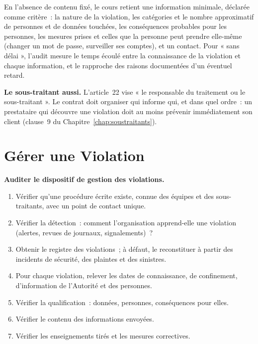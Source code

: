 En l'absence de contenu fixé, le cours retient une information minimale,
déclarée comme critère~: la nature de la violation, les catégories et le
nombre approximatif de personnes et de données touchées, les conséquences
probables pour les personnes, les mesures prises et celles que la personne
peut prendre elle-même (changer un mot de passe, surveiller ses comptes),
et un contact. Pour « sans délai », l'audit mesure le temps écoulé entre la
connaissance de la violation et chaque information, et le rapproche des
raisons documentées d'un éventuel retard.

\begin{boxinfo}
\textbf{Le sous-traitant aussi.} L'article~22 vise « le responsable du
traitement ou le sous-traitant ». Le contrat doit organiser qui informe
qui, et dans quel ordre~: un prestataire qui découvre une violation doit
au moins prévenir immédiatement son client (clause~9 du
Chapitre~\ref{chap:soustraitants}).
\end{boxinfo}

\section{Gérer une Violation}
\label{sec:c12-gerer}

\begin{boxprocedure}
\textbf{Auditer le dispositif de gestion des violations.}
\begin{enumerate}
    \item Vérifier qu'une procédure écrite existe, connue des équipes et des
          sous-traitants, avec un point de contact unique.
    \item Vérifier la détection~: comment l'organisation apprend-elle une
          violation (alertes, revues de journaux, signalements)~?
    \item Obtenir le registre des violations~; à défaut, le reconstituer à
          partir des incidents de sécurité, des plaintes et des sinistres.
    \item Pour chaque violation, relever les dates de connaissance, de
          confinement, d'information de l'Autorité et des personnes.
    \item Vérifier la qualification~: données, personnes, conséquences
          pour elles.
    \item Vérifier le contenu des informations envoyées.
    \item Vérifier les enseignements tirés et les mesures correctives.
\end{enumerate}
\end{boxprocedure}

